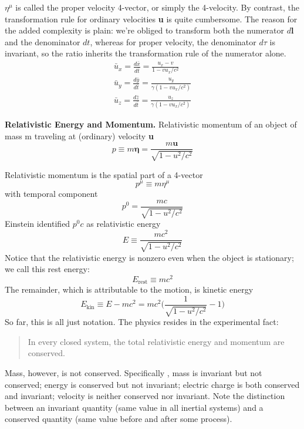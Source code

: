 \documentclass[../../../main.tex]{subfiles}
\begin{document}
$\eta^\mu$ is called the proper velocity 4-vector, or simply the 4-velocity. By contrast, the transformation rule for ordinary velocities \textbf{u} is quite cumbersome. The reason for the added complexity is plain: we're obliged to transform both the numerator $d\mathbf{l}$ and the denominator $dt$, whereas for proper velocity, the denominator $d\tau$ is invariant, so the ratio inherits the transformation rule of the numerator alone.
\begin{align*}
    \bar{u}_x=\frac{d\bar{x}}{d\bar{t}}=\frac{u_x-v}{1-vu_x/c^2}\\
    \bar{u}_y=\frac{d\bar{y}}{d\bar{t}}=\frac{u_y}{\gamma(1-vu_x/c^2)}\\
    \bar{u}_z=\frac{d\bar{z}}{d\bar{t}}=\frac{u_z}{\gamma(1-vu_x/c^2)}
\end{align*}

\textbf{Relativistic Energy and Momentum.} Relativistic momentum of an object of mass m traveling at (ordinary) velocity \textbf{u} 
\begin{equation*}
    p\equiv m\mathbf{\eta}=\frac{m\mathbf{u}}{\sqrt{1-u^2/c^2}}
\end{equation*}

Relativistic momentum is the spatial part of a 4-vector
\begin{equation*}
    p^\mu\equiv m\eta^\mu
\end{equation*}
with temporal component
\begin{equation*}
    p^0=\frac{mc}{\sqrt{1-u^2/c^2}}
\end{equation*}
Einstein identified $p^0c$ as relativistic energy
\begin{equation*}
    E\equiv\frac{mc^2}{\sqrt{1-u^2/c^2}}
\end{equation*}
Notice that the relativistic energy is nonzero even when the object is stationary; we call this rest energy:
\begin{equation*}
E_{\text{rest}}\equiv mc^2
\end{equation*}
The remainder, which is attributable to the motion, is kinetic energy
\begin{equation*}
E_{\text{kin}}\equiv E-mc^2=mc^2\bigg(\frac{1}{\sqrt{1-u^2/c^2}}-1\bigg)
\end{equation*}
So far, this is all just notation. The physics resides in the experimental fact:
\begin{quote}
    In every closed system, the total relativistic energy and momentum are conserved.
\end{quote}
Mass, however, is not conserved. Specifically , mass is invariant but not conserved; energy is conserved but not invariant; electric charge is both conserved and invariant; velocity is neither conserved nor invariant. Note the distinction between an invariant quantity (same value in all inertial systems) and a conserved quantity (same value before and after some process).
\end{document}
